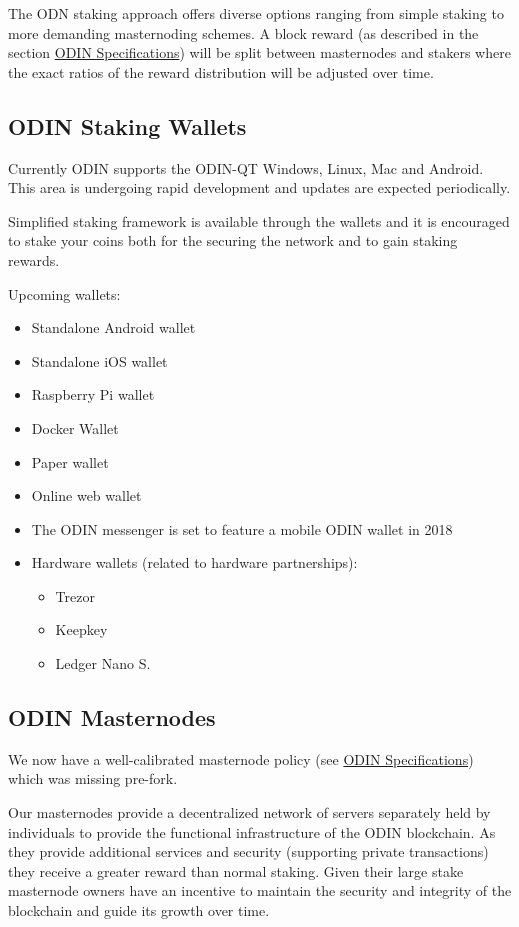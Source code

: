 \documentclass[12pt,letterpaper]{article}
\begin{document}
The ODN staking approach offers diverse options ranging from simple staking to more demanding masternoding schemes. A block reward (as described in the section \hyperlink{specifications}{ODIN Specifications}) will be split between masternodes and stakers where the exact ratios of the reward distribution will be adjusted over time.

\subsection{ODIN Staking Wallets}
Currently ODIN supports the ODIN-QT Windows, Linux, Mac and Android. This area is undergoing rapid development and updates are expected periodically.

Simplified staking framework is available through the wallets and it is encouraged to stake your coins both for the securing the network and to gain staking rewards.

Upcoming wallets:
\begin{itemize}
   \item Standalone Android wallet
   \item Standalone iOS wallet
   \item Raspberry Pi wallet
   \item Docker Wallet
   \item Paper wallet
   \item Online web wallet
   \item The ODIN messenger is set to feature a mobile ODIN wallet in 2018
   \item Hardware wallets (related to hardware partnerships):
   \begin{itemize}
      \item Trezor
      \item Keepkey
      \item Ledger Nano S.
   \end{itemize}
\end{itemize}

\subsection{​ODIN Masternodes}
We now have a well-calibrated masternode policy (see \hyperlink{specifications}{ODIN Specifications}) which was missing pre-fork.  

Our masternodes provide a decentralized network of servers separately held by individuals to provide the functional infrastructure of the ODIN blockchain.  As they provide additional services and security (supporting private transactions) they receive a greater reward than normal staking.   Given their large stake masternode owners have an incentive to maintain the security and integrity of the blockchain and guide its growth over time.
\end{document}
